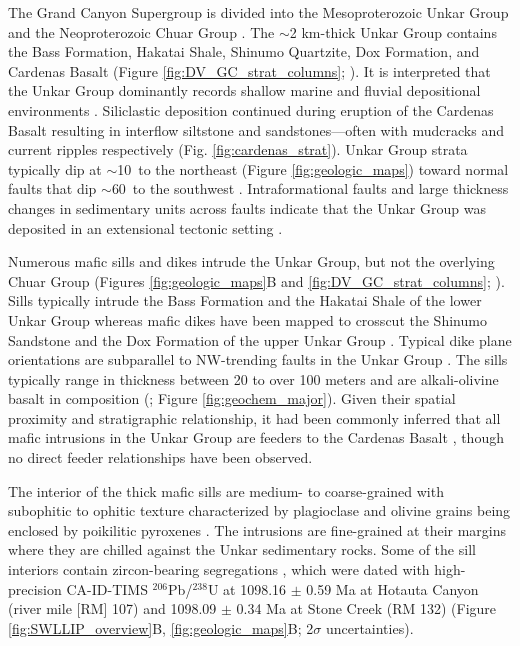 The Grand Canyon Supergroup is divided into the Mesoproterozoic Unkar Group and the Neoproterozoic Chuar Group \citep{Gundy1951a, Elston1989a, Dehler2017a}. The $\sim$2 km-thick Unkar Group contains the Bass Formation, Hakatai Shale, Shinumo Quartzite, Dox Formation, and Cardenas Basalt (Figure \ref{fig:DV_GC_strat_columns}; \citealp{Beus1974a, Elston1989a}). It is interpreted that the Unkar Group dominantly records shallow marine and fluvial depositional environments \citep{Elston1989a, Sears1990a, Hendricks1989a, Timmons2005a}. Siliclastic deposition continued during eruption of the Cardenas Basalt resulting in interflow siltstone and sandstones---often with mudcracks and current ripples respectively  (Fig. \ref{fig:cardenas_strat}). Unkar Group strata typically dip at $\sim$10\textdegree\ to the northeast (Figure \ref{fig:geologic_maps}) toward normal faults that dip $\sim$60\textdegree\ to the southwest \citep{Sears1973a, Timmons2012a}. Intraformational faults and large thickness changes in sedimentary units across faults indicate that the Unkar Group was deposited in an extensional tectonic setting \citep{Sears1990a, Karlstrom1998a, Timmons2001a}. 

Numerous mafic sills and dikes intrude the Unkar Group, but not the overlying Chuar Group (Figures \ref{fig:geologic_maps}B and \ref{fig:DV_GC_strat_columns}; \citealp{Elston1989a}). Sills typically intrude the Bass Formation and the Hakatai Shale of the lower Unkar Group \citep{Hendricks1989a} whereas mafic dikes have been mapped to crosscut the Shinumo Sandstone and the Dox Formation of the upper Unkar Group \citep{Timmons2012a}. Typical dike plane orientations are subparallel to NW-trending faults in the Unkar Group \citep{Huntoon1996a, Timmons2012a}. The sills typically range in thickness between 20 to over 100 meters and are alkali-olivine basalt in composition (\citealp{Hendricks1989a, Larson1994a}; Figure \ref{fig:geochem_major}). Given their spatial proximity and stratigraphic relationship, it had been commonly inferred that all mafic intrusions in the Unkar Group are feeders to the Cardenas Basalt \cite[e.g.][]{Huntoon1996a, Timmons2012a}, though no direct feeder relationships have been observed.

The interior of the thick mafic sills are medium- to coarse-grained with subophitic to ophitic texture characterized by plagioclase and olivine grains being enclosed by poikilitic pyroxenes \citep{Hendricks1989a}. The intrusions are fine-grained at their margins where they are chilled against the Unkar sedimentary rocks.  Some of the sill interiors contain zircon-bearing segregations \citep{Mohr2024a}, which were dated with high-precision CA-ID-TIMS $^{206}$Pb/$^{238}$U at 1098.16 $\pm$ 0.59 Ma at Hotauta Canyon (river mile [RM] 107) and 1098.09 $\pm$ 0.34 Ma at Stone Creek (RM 132) (Figure \ref{fig:SWLLIP_overview}B, \ref{fig:geologic_maps}B; 2$\sigma$ uncertainties). 

